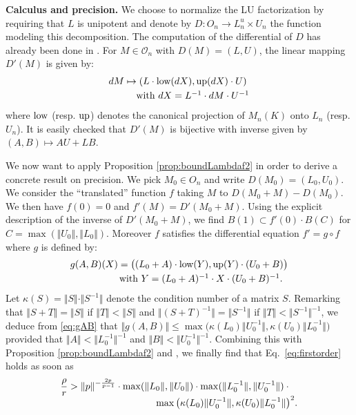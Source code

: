 \documentclass{sig-alternate}
\renewcommand{\O}{\mathcal O}
\newcommand{\low}{\text{\rm low}}
\newcommand{\up}{\text{\rm up}}
\begin{document}
\noindent
{\bf Calculus and precision.}
We choose to normalize the LU factorization by requiring that $L$ is 
unipotent and denote by $D : O_n \to L_n^u \times U_n$ the function 
modeling this decomposition. The computation of the differential of $D$ 
has already been done in \cite[Appendix B]{caruso-roe-vaccon:14a}. For
$M \in \O_n$ with $D(M) = (L,U)$, the linear mapping $D'(M)$ is given 
by:
$$\begin{array}{l}
dM \mapsto (L \cdot \low(dX), \up(dX) \cdot U) \smallskip \\
\hspace{1cm}\text{with } dX = L^{-1} \cdot dM \cdot U^{-1}
\end{array}$$
where $\low$ (resp. $\up$) denotes the canonical projection of $M_n(K)$ 
onto $L_n$ (resp. $U_n$). 
It is easily checked that $D'(M)$ is bijective with inverse given by
$(A,B) \mapsto AU+LB$.

We now want to apply Proposition \ref{prop:boundLambdaf2}
in order to derive a concrete result on precision. We pick $M_0 \in
O_n$ and write $D(M_0) = (L_0,U_0)$. We consider the ``translated'' 
function $f$ taking $M$ to $D(M_0+M)-D(M_0)$. We then have $f(0) = 0$ 
and $f'(M) = D'(M_0+M)$. Using the explicit description of the inverse
of $D'(M_0+M)$, we find $B(1) \subset f'(0) \cdot B(C)$
for $C = \max(\Vert U_0 \Vert, \Vert L_0 \Vert)$. Moreover $f$ satisfies 
the differential equation $f' = g \circ f$ where $g$ is defined by:
\begin{equation}
\label{eq:gAB}
\begin{array}{l}
g(A,B)(X) = \big( (L_0+A) \cdot \low(Y), \up(Y) \cdot (U_0+B) \big)
\smallskip \\
\hspace{1.8cm}\text{with } Y = (L_0+A)^{-1} \cdot X \cdot (U_0+B)^{-1}.
\end{array}
\end{equation}
Let $\kappa(S) = \Vert S \Vert \cdot \Vert S^{-1} \Vert$ denote the 
condition number of a matrix $S$. Remarking that $\Vert S + T 
\Vert = \Vert S \Vert$ if $\Vert T \Vert < \Vert S \Vert$ and $\Vert (S 
+ T)^{-1} \Vert = \Vert S^{-1} \Vert$ if $\Vert T \Vert < \Vert S^{-1} 
\Vert^{-1}$, we deduce from \eqref{eq:gAB} that
$\Vert g(A,B) \Vert \leq \max 
\big( \kappa(L_0) \Vert U_0^{-1} \Vert, 
\kappa(U_0) \Vert L_0^{-1} \Vert \big)$
provided that $\Vert A \Vert < \Vert L_0^{-1} \Vert^{-1}$ and 
$\Vert B \Vert < \Vert U_0^{-1} \Vert^{-1}$.
Combining this with Proposition \ref{prop:boundLambdaf2} and 
\cite[Proposition.~3.12]{caruso-roe-vaccon:14a}, we finally find that 
Eq.~\eqref{eq:firstorder} holds as soon as 
$$\begin{array}{l}
\displaystyle \frac \rho r > \Vert p \Vert^{-\frac{2p}{p-1}} \cdot
\max ( \Vert L_0 \Vert, \Vert U_0 \Vert) \cdot
\max ( \Vert L_0 ^{-1} \Vert, \Vert U_0 ^{-1} \Vert) \cdot{} \\
\hspace{3.5cm} \max \big( \kappa(L_0) \Vert U_0^{-1} \Vert, 
  \kappa(U_0) \Vert L_0^{-1} \Vert \big)^2.
\end{array}$$
\end{document}
